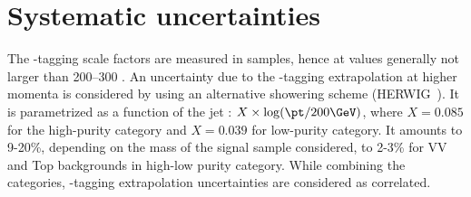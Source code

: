 \section{Systematic uncertainties}

\color{red}
\noindent The \V-tagging scale factors are measured in \ttbar samples, hence at \pt values generally not larger than 200--300 \GeV. An uncertainty due to the \V-tagging extrapolation at higher momenta is considered by using an alternative showering scheme (HERWIG~\cite{bib:HERWIG}). It is parametrized as a function of the jet \pt: $X \times \log(\pt/200 \GeV)$, where $X=0.085$ for the high-purity category and $X=0.039$ for low-purity category. It amounts to 9-20\%, depending on the mass of the signal sample considered, to 2-3\% for VV and Top backgrounds in high-low purity category. While combining the categories, \V-tagging extrapolation uncertainties are considered as correlated.

\clearpage

